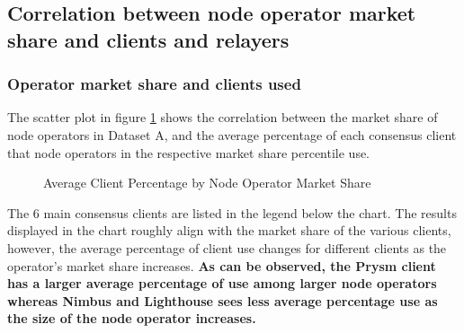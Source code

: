 \documentclass[conference]{IEEEtran}
\begin{document}
\subsection{Correlation between node operator market share and clients and relayers}

\subsubsection{Operator market share and clients used}

The scatter plot in figure \ref{fig:average_client_percentage_by_percentile} shows the correlation between the market share of node operators in Dataset A, and the average percentage of each consensus client that node operators in the respective market share percentile use.

\begin{figure}[htbp]
  \centering
  \caption{Average Client Percentage by Node Operator Market Share}
  \label{fig:average_client_percentage_by_percentile}
\end{figure}

The 6 main consensus clients are listed in the legend below the chart.  The results displayed in the chart roughly align with the market share of the various clients, however, the average percentage of client use changes for different clients as the operator's market share increases.  \textbf{As can be observed, the Prysm client has a larger average percentage of use among larger node operators whereas Nimbus and Lighthouse sees less average percentage use as the size of the node operator increases.}
\end{document}

